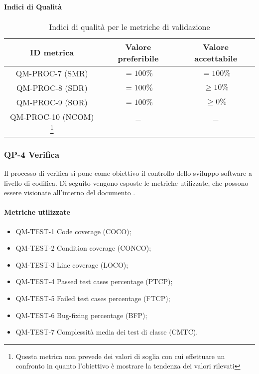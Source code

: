 		\paragraph{Indici di Qualità}

			\begin{center}
				\begin{longtable}{|c|c|c|}
				\hline
				\rowcolor{lighter-grayer}
				\textbf{ID metrica} & \textbf{Valore preferibile} & \textbf{Valore accettabile}\\
				\hline
				\endfirsthead
				\hline
				QM-PROC-7 (SMR) & \(= 100\%\) & \(= 100\%\) \\
				\hline
				QM-PROC-8 (SDR) & \(= 100\%\) & \(\geq 10\%\) \\
				\hline
				QM-PROC-9 (SOR) & \(= 100\%\) & \(\geq 0\%\) \\
				\hline
				QM-PROC-10 (NCOM) \footnote{Questa metrica non prevede dei valori di soglia con cui effettuare un confronto in quanto l'obiettivo è mostrare la tendenza dei valori rilevati} & \(-\) & \(-\) \\
				\hline
				\caption{Indici di qualità per le metriche di validazione}
				\end{longtable}
			\end{center}
	\newpage
	\subsubsection{QP-4 Verifica}

		Il processo di verifica si pone come obiettivo il controllo dello sviluppo software a livello di codifica.
		\newline
		Di seguito vengono esposte le metriche utilizzate, che possono essere visionate all'interno del documento .

		\paragraph{Metriche utilizzate}

			\begin{itemize}
				\item QM-TEST-1 Code coverage (COCO);
				\item QM-TEST-2 Condition coverage (CONCO);
				\item QM-TEST-3 Line coverage (LOCO);
				\item QM-TEST-4 Passed test cases percentage (PTCP);
				\item QM-TEST-5 Failed test cases percentage (FTCP);
				\item QM-TEST-6 Bug-fixing percentage (BFP);
				\item QM-TEST-7 Complessità media dei test di classe (CMTC).
			\end{itemize}



